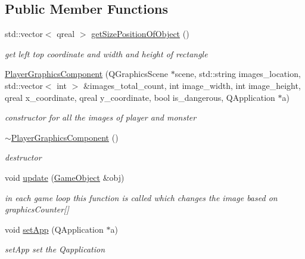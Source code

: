\subsection*{Public Member Functions}
\begin{DoxyCompactItemize}
\item 
std\-::vector$<$ qreal $>$ \hyperlink{classPlayerGraphicsComponent_a9e4f6d92f14886b23791ac2eb8846349}{get\-Size\-Position\-Of\-Object} ()
\begin{DoxyCompactList}\small\item\em get left top coordinate and width and height of rectangle \end{DoxyCompactList}\item 
\hyperlink{classPlayerGraphicsComponent_a398184a4c0bc09ff5011d57359bc102b}{Player\-Graphics\-Component} (Q\-Graphics\-Scene $\ast$scene, std\-::string images\-\_\-location, std\-::vector$<$ int $>$ \&images\-\_\-total\-\_\-count, int image\-\_\-width, int image\-\_\-height, qreal x\-\_\-coordinate, qreal y\-\_\-coordinate, bool is\-\_\-dangerous, Q\-Application $\ast$a)
\begin{DoxyCompactList}\small\item\em constructor for all the images of player and monster \end{DoxyCompactList}\item 
\hypertarget{classPlayerGraphicsComponent_a9bec033acf2dc9abab5e7240e47cc98f}{\hyperlink{classPlayerGraphicsComponent_a9bec033acf2dc9abab5e7240e47cc98f}{$\sim$\-Player\-Graphics\-Component} ()}\label{classPlayerGraphicsComponent_a9bec033acf2dc9abab5e7240e47cc98f}

\begin{DoxyCompactList}\small\item\em destructor \end{DoxyCompactList}\item 
void \hyperlink{classPlayerGraphicsComponent_ace3901cc8345392c22315f24d617e98b}{update} (\hyperlink{classGameObject}{Game\-Object} \&obj)
\begin{DoxyCompactList}\small\item\em in each game loop this function is called which changes the image based on graphics\-Counter\mbox{[}\mbox{]} \end{DoxyCompactList}\item 
void \hyperlink{classPlayerGraphicsComponent_a9f5a0e1621cb9809a7aebe2927a5fad3}{set\-App} (Q\-Application $\ast$a)
\begin{DoxyCompactList}\small\item\em set\-App set the Qapplication \end{DoxyCompactList}\end{DoxyCompactItemize}
